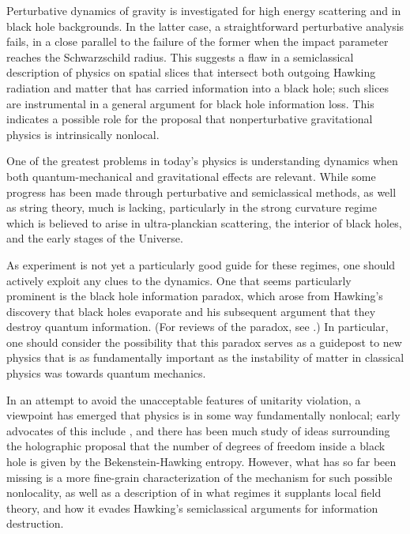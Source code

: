 Perturbative dynamics of gravity is investigated for high energy scattering and in black hole backgrounds.  In the latter case, a straightforward perturbative analysis fails, in a close parallel to the failure of the former when the impact parameter reaches the Schwarzschild radius.  This suggests a flaw in a semiclassical description of physics on spatial slices that intersect both outgoing Hawking radiation and matter that has carried information into a black hole; such slices are instrumental in a general argument for black hole information loss.  This indicates a possible role for the proposal that nonperturbative gravitational physics is intrinsically nonlocal.

\Date{}


One of the greatest problems in today's physics is understanding dynamics when both quantum-mechanical and gravitational effects are relevant.  While some progress has been made through perturbative and semiclassical methods, as well as string theory, much is lacking, particularly in the strong curvature regime which is believed to arise in ultra-planckian scattering, the interior of black holes, and the early stages of the Universe.   

As experiment is not yet a particularly good guide for these regimes, one should actively exploit any clues to the dynamics.  One that seems particularly prominent is the black hole information paradox, which arose from Hawking's discovery that black holes evaporate and his subsequent argument that they destroy quantum information.  (For reviews of the paradox, see .)  In particular, one should consider the possibility that this paradox serves as a guidepost to new physics that is as fundamentally important as  the instability of matter in classical physics was towards quantum mechanics.  

In an attempt to avoid the unacceptable features of unitarity violation, a viewpoint has emerged that physics is in some way fundamentally nonlocal; early advocates of this include , and there has been much study of ideas surrounding the holographic proposal that the number of degrees of freedom inside a black hole is given by the Bekenstein-Hawking entropy.  However, what has so far been missing is a more fine-grain characterization of the mechanism for such possible nonlocality, as well as a description of in what regimes it supplants  local field theory, and how  it evades Hawking's semiclassical arguments for information destruction.  

